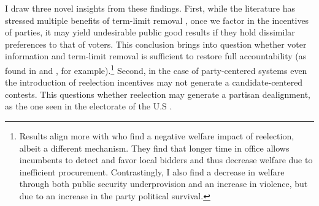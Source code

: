 \documentclass[12pt]{amsart}
\numberwithin{equation}{section}
\theoremstyle{definition}
\theoremstyle{definition}
\theoremstyle{definition}
\begin{document}
 I draw three novel insights from these findings. First, while the literature has stressed multiple benefits of term-limit removal \citep{alt_etal_2011, ferraz_finan_2011}, once we factor in the incentives of parties, it may yield undesirable public good results if they hold dissimilar preferences to that of voters. %
 This conclusion brings into question whether voter information and term-limit removal is sufficient to restore full accountability (as found in \citet{ferraz_finan_2011} and \citet{alt_etal_2011}, for example).\footnote{Results align more with \citet{coviello_etal_2017} who  find a negative welfare impact of reelection, albeit a different mechanism. They find that longer time in office allows incumbents to detect and favor local bidders and thus decrease welfare due to inefficient procurement. Contrastingly, I also find a decrease in welfare through both public security underprovision and an increase in violence, but due to an increase in the party political survival.} %
 Second, in the case of party-centered systems even the introduction of reelection incentives may not generate a candidate-centered contests. This questions whether reelection may generate a partisan dealignment, as the one seen in the electorate of the U.S  \citep{cox_katz_1996}.  
 
 
    
\end{document}
